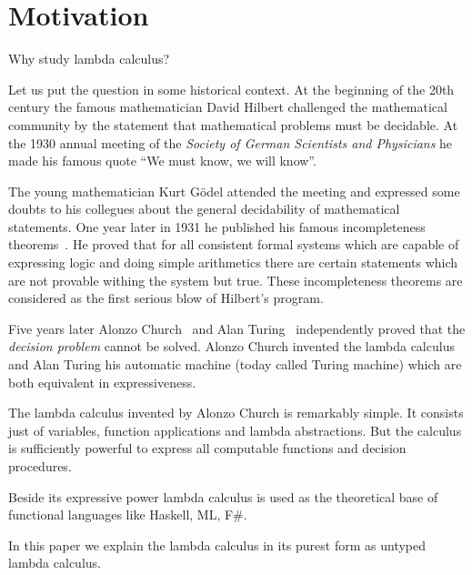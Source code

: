 \section{Motivation}

Why study lambda calculus?

Let us put the question in some historical context. At the beginning of the
20th century the famous mathematician David Hilbert challenged the
mathematical community by the statement that mathematical problems must be
decidable. At the 1930 annual meeting of the \emph{Society of German
  Scientists and Physicians} he made his famous quote ``We must know, we will
know''.

\noindent
{}


The young mathematician Kurt Gödel attended the meeting and expressed some
doubts to his collegues about the general decidability of mathematical
statements. One year later in 1931 he published his famous incompleteness
theorems~\cite{goedel1931}. He proved that for all consistent formal systems
which are capable of expressing logic and doing simple arithmetics there are
certain statements which are not provable withing the system but true. These
incompleteness theorems are considered as the first serious blow of Hilbert's
program.

Five years later Alonzo Church~\cite{church1936} and Alan
Turing~\cite{turing1936} independently proved that the \emph{decision problem}
cannot be solved. Alonzo Church invented the lambda calculus and Alan Turing
his automatic machine (today called Turing machine) which are both equivalent
in expressiveness.

The lambda calculus invented by Alonzo Church is remarkably simple. It
consists just of variables, function applications and lambda abstractions. But
the calculus is sufficiently powerful to express all computable functions and
decision procedures.

Beside its expressive power lambda calculus is used as the theoretical base of
functional languages like Haskell, ML, F\#.

In this paper we explain the lambda calculus in its purest form as untyped
lambda calculus.
